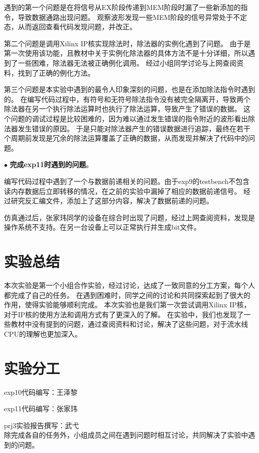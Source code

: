 \documentclass[11pt]{article}
\begin{document}
遇到的第一个问题是在将信号从EX阶段传递到MEM阶段时漏了一些新添加的指令，导致数据通路出现问题。
观察波形发现一些MEM阶段的信号异常处于不定态，从而返回查看代码发现问题，并改正。

第二个问题是调用Xilinx IP核实现除法时，除法器的实例化遇到了问题。
由于是第一次使用该功能，且教材中关于实例化除法器的具体方法不是十分详细，所以遇到了一些困难，除法器无法被正确例化调用。
经过小组同学讨论与上网查阅资料，找到了正确的例化方法。

第三个问题是本实验中遇到的最令人印象深刻的问题，也是在添加除法指令时遇到的。
在编写代码过程中，有符号和无符号除法指令没有被完全隔离开，导致两个除法器在另一个执行除法运算时也执行了除法运算，导致产生了错误的数据。
这个问题的调试过程是比较困难的，因为难以通过发生错误的指令附近的波形看出除法器发生错误的原因。
于是只能对除法器产生的错误数据进行追踪，最终在若干个周期前发现是冗余的除法运算覆盖了正确的数据，从而发现并解决了代码中的问题。

\noindent
$\bullet$
\textbf{完成exp11时遇到的问题}。

编写代码过程中遇到了一个与数据前递相关的问题。由于exp9的testbench不包含读内存数据后立即转移的情况，在之前的实验中漏掉了相应的数据前递信号。
经过研究反汇编文件，添加上了这部分内容，解决了数据前递的问题。

仿真通过后，张家玮同学的设备在综合时出现了问题，经过上网查阅资料，发现是操作系统不支持。在另一台设备上可以正常执行并生成bit文件。

\section{实验总结}
本次实验是第一个小组合作实验，经过讨论，达成了一致同意的分工方案，每个人都完成了自己的任务。
在遇到困难时，同学之间的讨论和共同探索起到了很大的作用，使得实验能够顺利完成。
本次实验也是我们第一次尝试调用Xilinx IP核，对于IP核的使用方法和调用方式有了更深入的了解。
在实验中，我们也发现了一些教材中没有提到的问题，通过查阅资料和讨论，解决了这些问题，对于流水线CPU的理解也更加深入。

\section{实验分工}
exp10代码编写：王泽黎

exp11代码编写：张家玮

prj3实验报告撰写：武弋\\
除完成各自的任务外，小组成员之间在遇到问题时相互讨论，共同解决了实验中遇到的问题。
\end{document}
